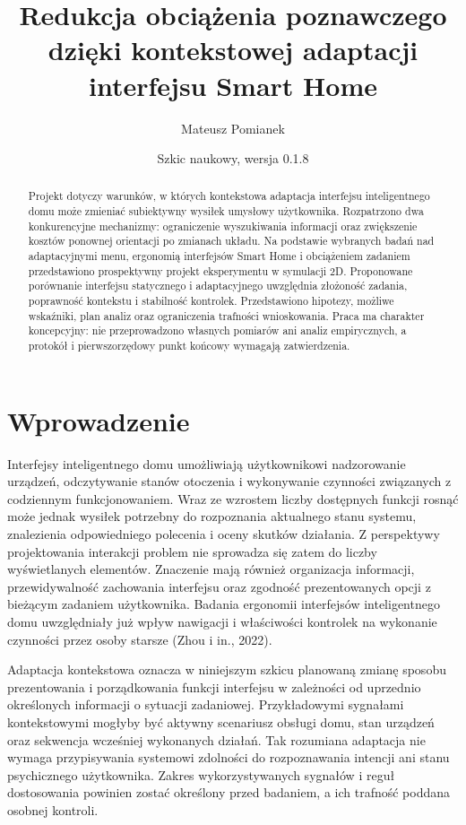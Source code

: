 \documentclass[11pt,a4paper]{article}
\title{Redukcja obciążenia poznawczego dzięki kontekstowej adaptacji interfejsu Smart Home}
\author{Mateusz Pomianek}
\date{Szkic naukowy, wersja 0.1.8}
\begin{document}
\maketitle

\begin{abstract}

Projekt dotyczy warunków, w których kontekstowa adaptacja interfejsu inteligentnego domu może zmieniać subiektywny wysiłek umysłowy użytkownika. Rozpatrzono dwa konkurencyjne mechanizmy: ograniczenie wyszukiwania informacji oraz zwiększenie kosztów ponownej orientacji po zmianach układu. Na podstawie wybranych badań nad adaptacyjnymi menu, ergonomią interfejsów Smart Home i obciążeniem zadaniem przedstawiono prospektywny projekt eksperymentu w symulacji 2D. Proponowane porównanie interfejsu statycznego i adaptacyjnego uwzględnia złożoność zadania, poprawność kontekstu i stabilność kontrolek. Przedstawiono hipotezy, możliwe wskaźniki, plan analiz oraz ograniczenia trafności wnioskowania. Praca ma charakter koncepcyjny: nie przeprowadzono własnych pomiarów ani analiz empirycznych, a protokół i pierwszorzędowy punkt końcowy wymagają zatwierdzenia.

\end{abstract}

\section{Wprowadzenie}

Interfejsy inteligentnego domu umożliwiają użytkownikowi nadzorowanie urządzeń, odczytywanie stanów otoczenia i wykonywanie czynności związanych z codziennym funkcjonowaniem. Wraz ze wzrostem liczby dostępnych funkcji rosnąć może jednak wysiłek potrzebny do rozpoznania aktualnego stanu systemu, znalezienia odpowiedniego polecenia i oceny skutków działania. Z perspektywy projektowania interakcji problem nie sprowadza się zatem do liczby wyświetlanych elementów. Znaczenie mają również organizacja informacji, przewidywalność zachowania interfejsu oraz zgodność prezentowanych opcji z bieżącym zadaniem użytkownika. Badania ergonomii interfejsów inteligentnego domu uwzględniały już wpływ nawigacji i właściwości kontrolek na wykonanie czynności przez osoby starsze (Zhou i in., 2022).

Adaptacja kontekstowa oznacza w niniejszym szkicu planowaną zmianę sposobu prezentowania i porządkowania funkcji interfejsu w zależności od uprzednio określonych informacji o sytuacji zadaniowej. Przykładowymi sygnałami kontekstowymi mogłyby być aktywny scenariusz obsługi domu, stan urządzeń oraz sekwencja wcześniej wykonanych działań. Tak rozumiana adaptacja nie wymaga przypisywania systemowi zdolności do rozpoznawania intencji ani stanu psychicznego użytkownika. Zakres wykorzystywanych sygnałów i reguł dostosowania powinien zostać określony przed badaniem, a ich trafność poddana osobnej kontroli.
\end{document}
